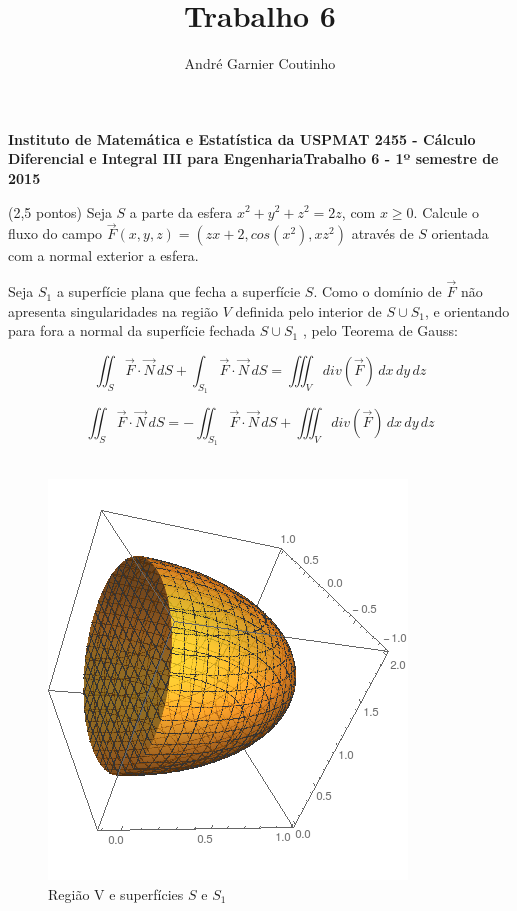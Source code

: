 \documentclass[12pt,a4paper]{article}
\title{Trabalho 6}
\author{André Garnier Coutinho}
\begin{document}
\begin{center}
\textbf{Instituto de Matemática e Estatística da USP\linebreak MAT 2455 - Cálculo Diferencial e Integral III para Engenharia\linebreak Trabalho 6 - 1º semestre de 2015}
\end{center}



 (2,5 pontos) Seja $S$ a parte da esfera $x^2 + y^2 + z^2 = 2z$, com $x \geq 0$. Calcule o fluxo do campo $\vec{F}(x,y,z) = (zx+2, cos(x^2), xz^2)$ através de $S$ orientada com a normal exterior a esfera.


Seja $S_1$ a superfície plana que fecha a superfície $S$. Como o domínio de $\vec{F} $ não apresenta singularidades na região $V$ definida pelo interior de $S \cup S_1 $, e orientando para fora a normal da superfície fechada $S \cup S_1$ , pelo Teorema de Gauss:

$$ \iint_{S} \vec{F}  \cdot \vec{N} \,dS + \int_{ S_1 } \vec{F}  \cdot \vec{N} \,dS = \iiint_{V} div(\vec{F})  \,dx \,dy \,dz $$

\begin{equation}
\iint_{S} \vec{F}  \cdot \vec{N} \,dS = - \iint_{ S_1 } \vec{F}   \cdot \vec{N} \,dS  + \iiint_{V} div(\vec{F}) \,dx \,dy \,dz
\label{eq:1}
\end{equation} \\


\begin{figure}[h!]
	\centering
	\includegraphics[scale=0.5]{figura1.png}  
	\caption{Região V e superfícies $S$ e $S_1$ }
	\label{fig:figura1}
\end{figure}
\end{document}
